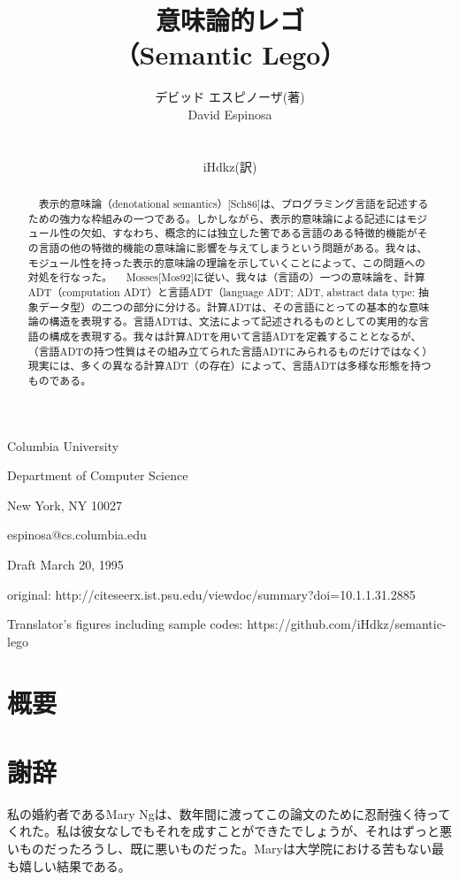 \documentclass[11pt, oneside]{jsbook}   	%
\title{意味論的レゴ \\
（Semantic Lego）
}
\author{デビッド エスピノーザ(著)\\
David Espinosa\\
\\
\begin{small}
iHdkz(訳)
\end{small}
}
\date{}							%
\begin{document}
\maketitle
\begin{center}
Columbia University

Department of Computer Science

New York, NY 10027

espinosa@cs.columbia.edu

Draft March 20, 1995


original: http://citeseerx.ist.psu.edu/viewdoc/summary?doi=10.1.1.31.2885
\end{center}

Translator's figures including sample codes: https://github.com/iHdkz/semantic-lego

\newpage

\section*{概要}
\begin{abstract}
　表示的意味論（denotational semantics）[Sch86]は、プログラミング言語を記述するための強力な枠組みの一つである。しかしながら、表示的意味論による記述にはモジュール性の欠如、すなわち、概念的には独立した筈である言語のある特徴的機能がその言語の他の特徴的機能の意味論に影響を与えてしまうという問題がある。我々は、モジュール性を持った表示的意味論の理論を示していくことによって、この問題への対処を行なった。
　Mosses[Mos92]に従い、我々は（言語の）一つの意味論を、計算ADT（computation ADT）と言語ADT（language ADT; ADT, abstract data type: 抽象データ型）の二つの部分に分ける。計算ADTは、その言語にとっての基本的な意味論の構造を表現する。言語ADTは、文法によって記述されるものとしての実用的な言語の構成を表現する。我々は計算ADTを用いて言語ADTを定義することとなるが、（言語ADTの持つ性質はその組み立てられた言語ADTにみられるものだけではなく）現実には、多くの異なる計算ADT（の存在）によって、言語ADTは多様な形態を持つものである。
\end{abstract}

\newpage
\tableofcontents

\newpage
\section*{謝辞}
私の婚約者であるMary Ngは、数年間に渡ってこの論文のために忍耐強く待ってくれた。私は彼女なしでもそれを成すことができたでしょうが、それはずっと悪いものだったろうし、既に悪いものだった。Maryは大学院における苦もない最も嬉しい結果である。
\end{document}
